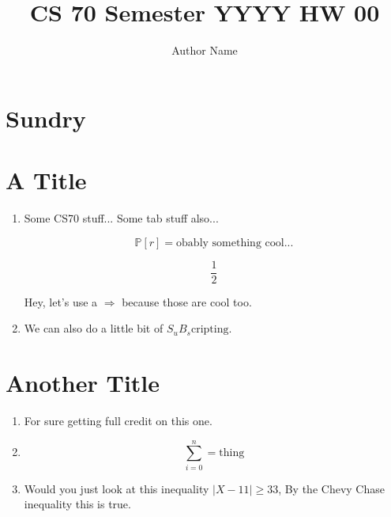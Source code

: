 \documentclass{article}
\title{CS 70 Semester YYYY HW 00}
\author{Author Name}
\newcommand{\PP}{\mathbb{P}}
\newcommand\tab[1][1cm]{\hspace*{#1}}
\begin{document}
\maketitle

\section*{Sundry}

\section{A Title}

\begin{enumerate}[label=(\alph*)]
\item{
    Some CS70 stuff... \newline
    \tab Some tab stuff also...

    \begin{equation}
        \PP[r] = \text{obably something cool...}
    \end{equation}

    \begin{equation}
        \frac{1}{2}
    \end{equation}

    Hey, let's use a $\Rightarrow$ because those are cool too.
}
\item{
    
    We can also do a little bit of $S_u B_s\text{cripting}$.
}
\end{enumerate}

\section{Another Title}
\begin{enumerate}[label=(\alph*)]
\item{
    For sure getting full credit on this one. 
}

\item{
    \begin{equation}
        \sum_{i = 0}^{n} = \text{thing}
    \end{equation}
}
\item{
    Would you just look at this inequality $|X - 11| \geq 33$, By the Chevy Chase inequality
    this is true.
}
\end{enumerate}
\end{document}

